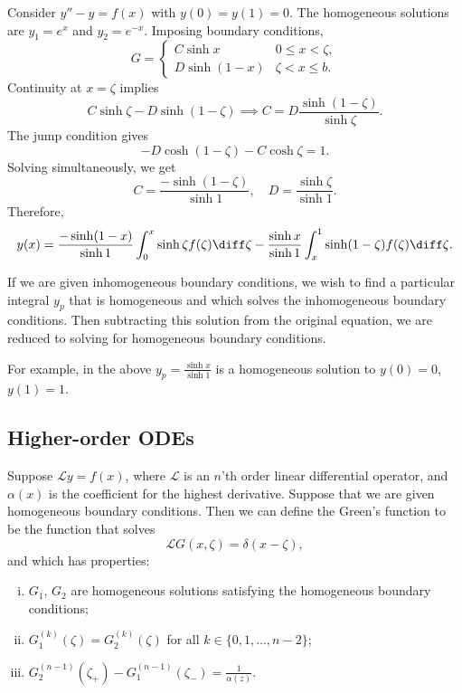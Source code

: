 \documentclass[12pt]{article}
\begin{document}
\begin{exbox}
	Consider $y'' - y = f(x)$ with $y(0) = y(1) = 0$. The homogeneous solutions are $y_1 = e^{x}$ and $y_2 = e^{-x}$. Imposing boundary conditions,
	\[
	G =
	\begin{cases}
		C \sinh x & 0 \leq x < \zeta, \\
		D \sinh (1 - x) & \zeta < x \leq b.
	\end{cases}
	\]
	Continuity at $x = \zeta$ implies
	\[
		C \sinh \zeta - D \sinh (1 - \zeta) \implies C = D \frac{\sinh (1 - \zeta)}{\sinh \zeta}
	.\]
	The jump condition gives
	\[
		-D \cosh (1 - \zeta) - C \cosh \zeta = 1
	.\]
	Solving simultaneously, we get
	\[
		C = \frac{- \sinh(1 - \zeta)}{\sinh 1}, \quad D = \frac{\sinh \zeta}{\sinh 1}
	.\]
	Therefore,
	\[
		y(x) = \frac{-\sinh(1 - x)}{\sinh 1} \int_{0}^{x} \sinh \zeta f(\zeta) \diff \zeta - \frac{\sinh x}{\sinh 1} \int_{x}^{1} \sinh (1 - \zeta)f(\zeta) \diff \zeta
	.\]
\end{exbox}

If we are given inhomogeneous boundary conditions, we wish to find a particular integral $y_p$ that is homogeneous and which solves the inhomogeneous boundary conditions. Then subtracting this solution from the original equation, we are reduced to solving for homogeneous boundary conditions.

For example, in the above $y_p=  \frac{\sinh x}{\sinh 1}$ is a homogeneous solution to $y(0) = 0$, $y(1) = 1$.

\subsection{Higher-order ODEs}%
\label{sub:higher_order_odes}

Suppose $\mathcal{L}y = f(x)$, where $\mathcal{L}$ is an $n$'th order linear differential operator, and $\alpha(x)$ is the coefficient for the highest derivative. Suppose that we are given homogeneous boundary conditions. Then we can define the Green's function to be the function that solves
\[
	\mathcal{L}G(x, \zeta) = \delta(x - \zeta)
,\]
and which has properties:
\begin{enumerate}[(i)]
	\item $G_1$, $G_2$ are homogeneous solutions satisfying the homogeneous boundary conditions;
	\item $G_1^{(k)}(\zeta) = G_2^{(k)}(\zeta)$ for all $k \in \{0, 1, \ldots, n-2\}$;
	\item $G_2^{(n-1)}(\zeta_{+}) - G_1^{(n-1)}(\zeta_{-}) = \frac{1}{\alpha(z)}$.
\end{enumerate}
\end{document}

